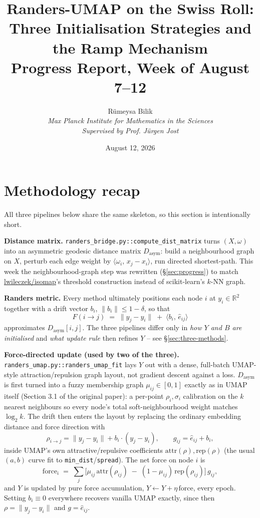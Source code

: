 \documentclass[11pt]{article}
\title{\textbf{Randers-UMAP on the Swiss Roll:}\\[2pt]
\textbf{Three Initialisation Strategies and the Ramp Mechanism}\\[4pt]
\Large\color{headerblue}Progress Report, Week of August 7--12}
\author{Rümeysa Bilik \\ \textit{Max Planck Institute for Mathematics in the Sciences} \\ \textit{Supervised by Prof. Jürgen Jost}}
\date{August 12, 2026}
\begin{document}
\maketitle

\section{Methodology recap}
\label{sec:methodology}

All three pipelines below share the same skeleton, so this section is intentionally short.

\textbf{Distance matrix.} \texttt{randers\_bridge.py::compute\_dist\_matrix} turns $(X,\omega)$
into an asymmetric geodesic distance matrix $D_{\mathrm{asym}}$: build a neighbourhood graph on
$X$, perturb each edge weight by $\langle\omega_i,\,x_j-x_i\rangle$, run directed shortest-path.
This week the neighbourhood-graph step was rewritten (\S\ref{sec:progress}) to match
\href{https://github.com/lwileczek/isomap}{lwileczek/isomap}'s threshold construction instead of
scikit-learn's $k$-NN graph.

\textbf{Randers metric.} Every method ultimately positions each node $i$ at $y_i\in\mathbb R^2$
together with a drift vector $b_i$, $\lVert b_i\rVert\le1-\delta$, so that
\begin{equation}
F(i\to j) \;=\; \lVert y_j-y_i\rVert \;+\; \langle b_i,\,\hat e_{ij}\rangle
\label{eq:randers}
\end{equation}
approximates $D_{\mathrm{asym}}[i,j]$. The three pipelines differ only in \emph{how $Y$ and $B$ are
initialised} and \emph{what update rule} then refines $Y$ -- see \S\ref{sec:three-methods}.

\textbf{Force-directed update (used by two of the three).}
\texttt{randers\_umap.py::randers\_umap\_fit} lays $Y$ out with a dense, full-batch UMAP-style
attraction/repulsion graph layout, not gradient descent against a loss. $D_{\mathrm{asym}}$ is
first turned into a fuzzy membership graph $\mu_{ij}\in[0,1]$ exactly as in UMAP itself (Section
3.1 of the original paper): a per-point $\rho_i,\sigma_i$ calibration on the $k$ nearest neighbours
so every node's total soft-neighbourhood weight matches $\log_2 k$. The drift then enters the
layout by replacing the ordinary embedding distance and force direction with
\begin{equation}
\rho_{i\to j} = \lVert y_j-y_i\rVert + b_i\cdot(y_j-y_i), \qquad
g_{ij} = \hat e_{ij} + b_i,
\label{eq:rho-g}
\end{equation}
inside UMAP's own attractive/repulsive coefficients $\mathrm{attr}(\rho),\mathrm{rep}(\rho)$ (the
usual $(a,b)$ curve fit to \texttt{min\_dist}/\texttt{spread}). The net force on node $i$ is
\begin{equation}
\mathrm{force}_i \;=\; \sum_j \Big[\mu_{ij}\,\mathrm{attr}(\rho_{ij}) \;-\; (1-\mu_{ij})\,\mathrm{rep}(\rho_{ij})\Big]\, g_{ij},
\end{equation}
and $Y$ is updated by pure force accumulation, $Y\leftarrow Y+\eta\,\mathrm{force}$, every epoch.
Setting $b_i\equiv0$ everywhere recovers vanilla UMAP exactly, since then $\rho=\lVert
y_j-y_i\rVert$ and $g=\hat e_{ij}$.
\end{document}
